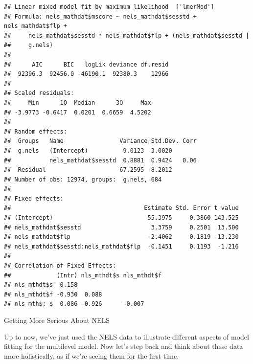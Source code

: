 \documentclass[ignorenonframetext,]{beamer}
\begin{document}
\begin{frame}[fragile]{}

\begin{verbatim}
## Linear mixed model fit by maximum likelihood  ['lmerMod']
## Formula: nels_mathdat$mscore ~ nels_mathdat$sesstd + nels_mathdat$flp +  
##     nels_mathdat$sesstd * nels_mathdat$flp + (nels_mathdat$sesstd |  
##     g.nels)
## 
##      AIC      BIC   logLik deviance df.resid 
##  92396.3  92456.0 -46190.1  92380.3    12966 
## 
## Scaled residuals: 
##     Min      1Q  Median      3Q     Max 
## -3.9773 -0.6417  0.0201  0.6659  4.5202 
## 
## Random effects:
##  Groups   Name                Variance Std.Dev. Corr
##  g.nels   (Intercept)          9.0123  3.0020       
##           nels_mathdat$sesstd  0.8881  0.9424   0.06
##  Residual                     67.2595  8.2012       
## Number of obs: 12974, groups:  g.nels, 684
## 
## Fixed effects:
##                                      Estimate Std. Error t value
## (Intercept)                           55.3975     0.3860 143.525
## nels_mathdat$sesstd                    3.3759     0.2501  13.500
## nels_mathdat$flp                      -2.4062     0.1819 -13.230
## nels_mathdat$sesstd:nels_mathdat$flp  -0.1451     0.1193  -1.216
## 
## Correlation of Fixed Effects:
##             (Intr) nls_mthdt$s nls_mthdt$f
## nls_mthdt$s -0.158                        
## nls_mthdt$f -0.930  0.088                 
## nls_mth$:_$  0.086 -0.926      -0.007
\end{verbatim}

\end{frame}

\begin{frame}{Getting More Serious About NELS}

Up to now, we've just used the NELS data to illustrate different aspects
of model fitting for the multilevel model. Now let's step back and think
about these data more holistically, as if we're seeing them for the
first time.

\end{frame}
\end{document}

